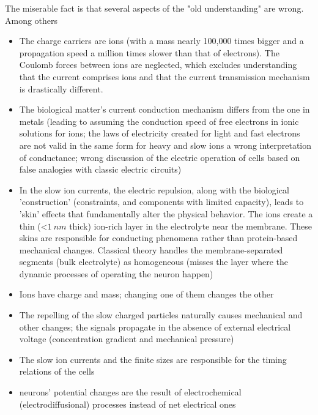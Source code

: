 The miserable fact is that several aspects of the "old understanding" are wrong. Among others
\begin{itemize}
 \item The charge carriers are ions (with a mass nearly 100,000 times bigger and a propagation speed a million times slower than that of electrons).
 The Coulomb forces between ions are neglected,
 which excludes understanding that the current comprises ions and that
the current transmission mechanism is drastically different.
 
 \item 
The biological matter's current conduction mechanism differs from the one in metals (leading to assuming the conduction speed of free electrons in ionic solutions for ions; the laws of electricity created for light and fast electrons are not valid in the same form for heavy and slow ions a wrong interpretation of conductance; wrong discussion of the electric operation of cells based on false analogies with classic electric circuits)

\item In the slow ion currents, the electric repulsion, along with the biological 'construction' (constraints, and components with limited capacity), leads to 'skin' effects that fundamentally alter the physical behavior.
The ions create a thin (\textless $1~nm$ thick) ion-rich layer   in the electrolyte near the membrane.
These skins are responsible for conducting phenomena rather than protein-based mechanical changes.
Classical theory handles the membrane-separated segments (bulk electrolyte) as homogeneous
(misses the layer where the dynamic processes of operating the neuron happen)



\item Ions have charge and mass; changing one of them changes the other

 \item The repelling of the slow charged particles naturally causes mechanical and other changes; the signals propagate in the absence of external electrical voltage (concentration gradient and mechanical pressure)
 
 \item The slow ion currents and the finite sizes are responsible for the timing relations of the cells
 \item neurons' potential changes are the result of electrochemical (electrodiffusional)  processes instead of net electrical ones
 \end{itemize}




